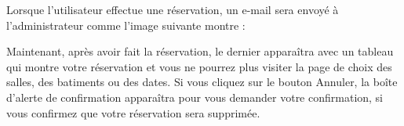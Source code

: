 \documentclass{article}
\begin{document}
\begin{enumerate}
\begin{enumerate}
               \noindent{}
  
\end{enumerate}  

Lorsque l'utilisateur effectue une réservation, un e-mail sera envoyé à l'administrateur comme l'image suivante montre :

\vspace{0.7cm}
               \hspace*{-0.7in}

               \noindent{}  
  
  
  
	Maintenant, après avoir fait la réservation, le dernier apparaîtra avec un tableau qui montre votre réservation et vous ne pourrez plus visiter la page de choix des salles, des batiments ou des dates. Si vous cliquez sur le bouton Annuler, la boîte d'alerte de confirmation apparaîtra pour vous demander votre confirmation, si vous confirmez que votre réservation sera supprimée.
  

\end{enumerate}
\end{document}
